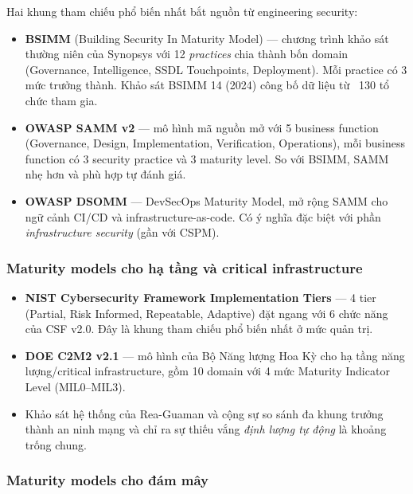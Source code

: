 Hai khung tham chiếu phổ biến nhất bắt nguồn từ engineering security:
\begin{itemize}
  \item \textbf{BSIMM} (Building Security In Maturity Model) \cite{bsimm_v14} --- chương trình khảo sát thường niên của Synopsys với 12 \textit{practices} chia thành bốn domain (Governance, Intelligence, SSDL Touchpoints, Deployment). Mỗi practice có 3 mức trưởng thành. Khảo sát BSIMM 14 (2024) công bố dữ liệu từ ~130 tổ chức tham gia.
  \item \textbf{OWASP SAMM v2} \cite{owasp_samm_v2} --- mô hình mã nguồn mở với 5 business function (Governance, Design, Implementation, Verification, Operations), mỗi business function có 3 security practice và 3 maturity level. So với BSIMM, SAMM nhẹ hơn và phù hợp tự đánh giá.
  \item \textbf{OWASP DSOMM} \cite{owasp_dsomm} --- DevSecOps Maturity Model, mở rộng SAMM cho ngữ cảnh CI/CD và infrastructure-as-code. Có ý nghĩa đặc biệt với phần \textit{infrastructure security} (gần với CSPM).
\end{itemize}

\subsubsection*{Maturity models cho hạ tầng và critical infrastructure}

\begin{itemize}
  \item \textbf{NIST Cybersecurity Framework Implementation Tiers} \cite{nist_csf_2024} --- 4 tier (Partial, Risk Informed, Repeatable, Adaptive) đặt ngang với 6 chức năng của CSF v2.0. Đây là khung tham chiếu phổ biến nhất ở mức quản trị.
  \item \textbf{DOE C2M2 v2.1} \cite{c2m2_v2_1} --- mô hình của Bộ Năng lượng Hoa Kỳ cho hạ tầng năng lượng/critical infrastructure, gồm 10 domain với 4 mức Maturity Indicator Level (MIL0--MIL3).
  \item Khảo sát hệ thống của Rea-Guaman và cộng sự \cite{rea2020cyber_maturity_systematic} so sánh đa khung trưởng thành an ninh mạng và chỉ ra sự thiếu vắng \textit{định lượng tự động} là khoảng trống chung.
\end{itemize}

\subsubsection*{Maturity models cho đám mây}

